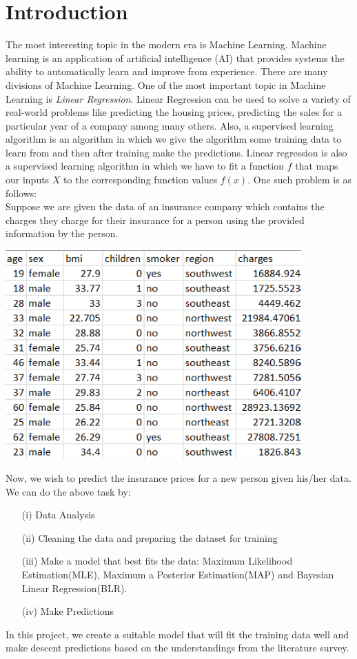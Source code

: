 \documentclass[12pt]{article}
\numberwithin{equation}{section}
\begin{document}
\section{Introduction}\label{intro}
The most interesting topic in the modern era is Machine Learning. Machine learning is an application of artificial intelligence (AI) that provides systems the ability to automatically learn and improve from experience. There are many divisions of Machine Learning. One of the most important topic in Machine Learning is \textit{Linear Regression}. Linear Regression can be used to solve a variety of real-world problems like predicting the housing prices, predicting the sales for a particular year of a company among many others. Also, a supervised learning algorithm is an algorithm in which we give the algorithm some training data to learn from and then after training make the predictions. Linear regression is also a supervised learning algorithm in which we have to fit a function $f$ that maps our inputs $X$ to the corresponding function values $f(x)$. One such problem is as follows:\\
Suppose we are given the data of an insurance company which contains the charges they charge for their insurance for a person using the provided information by the person.
\begin{center}
	\includegraphics[height=8cm]{slide2}
\end{center}
Now, we wish to predict the insurance prices for a new person given his/her data.
We can do the above task by:
\begin{itemize}
	\item[(i)] Data Analysis
	\item[(ii)] Cleaning the data and preparing the dataset for training
	\item[(iii)] Make a model that best fits the data: Maximum Likelihood Estimation(MLE), Maximum a Posterior Estimation(MAP) and Bayesian Linear Regression(BLR).
	\item[(iv)] Make Predictions
\end{itemize}
In this project,  we  create a suitable model that will fit the training data well and make descent predictions based on the understandings from the literature survey.
\end{document}
